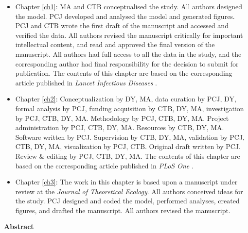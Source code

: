   \begin{itemize}
    
   \item Chapter \ref{ch1}: MA and CTB conceptualised the study. All authors designed the model. PCJ developed and analysed the model and generated figures. PCJ and CTB wrote the first draft of the manuscript and accessed and verified the data. All authors revised the manuscript critically for important intellectual content, and read and approved the final version of the manuscript. All authors had full access to all the data in the study, and the corresponding author had final responsibility for the decision to submit for publication. The contents of this chapter are based on the corresponding article published in \textit{Lancet Infectious Diseases} \cite{jentsch2021prioritising}.
   
   \item Chapter \ref{ch2}: Conceptualization by DY, MA, data curation by PCJ, DY, formal analysis by PCJ, funding acquisition by CTB, DY, MA, investigation by PCJ, CTB, DY, MA. Methodology by PCJ, CTB, DY, MA. Project administration by PCJ, CTB, DY, MA. Resources by CTB, DY, MA. Software written by PCJ. Supervision by CTB, DY, MA, validation by PCJ, CTB, DY, MA, visualization by PCJ, CTB. Original draft written by PCJ. Review & editing by PCJ, CTB, DY, MA. The contents of this chapter are based on the corresponding article published in \textit{PLoS One} \cite{jentsch2020go}.

   
   \item Chapter \ref{ch3}: The work in this chapter is based upon a manuscript under review at the \textit{Journal of Theoretical Ecology}. All authors conceived ideas for the study. PCJ designed and coded the model, performed
   analyses, created figures, and drafted the manuscript. All authors revised the manuscript.
   

  \end{itemize}
 \cleardoublepage
 

\begin{center}\textbf{Abstract}\end{center}


